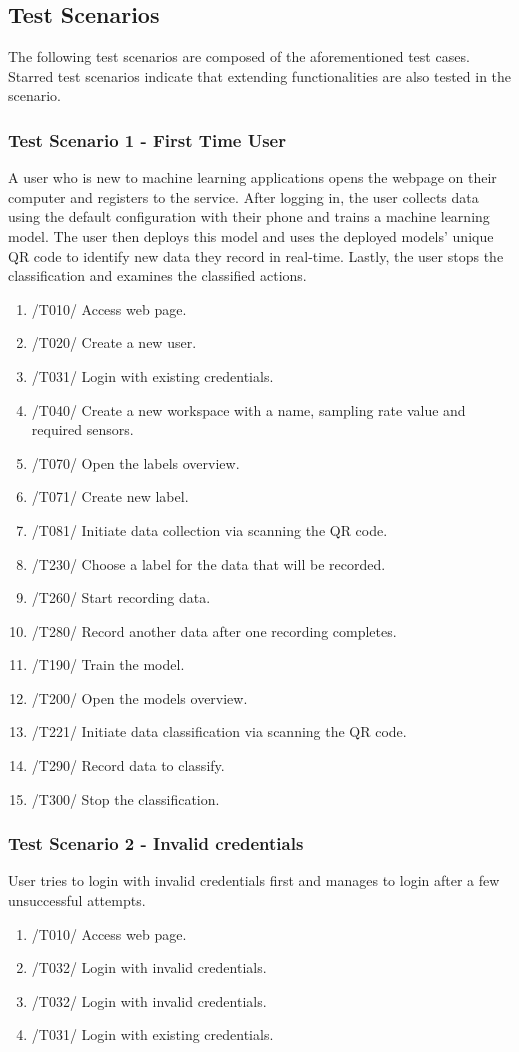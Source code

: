 \subsection{Test Scenarios}
The following test scenarios are composed of the aforementioned test cases. Starred test scenarios indicate that extending functionalities are also tested in the scenario.
\subsubsection{Test Scenario 1 - First Time User}
A user who is new to machine learning applications opens the webpage on their computer and registers to the service. After logging in, the user collects data using the default configuration with their phone and trains a machine learning model. The user then deploys this model and uses the deployed models' unique QR code to identify new data they record in real-time. Lastly, the user stops the classification and examines the classified actions.
\begin{enumerate}
    \item /T010/ Access web page.
    \item /T020/ Create a new user.
    \item /T031/ Login with existing credentials.
    \item /T040/ Create a new workspace with a name, sampling rate value and required sensors.
    \item /T070/ Open the labels overview.
    \item /T071/ Create new label.
    \item /T081/ Initiate data collection via scanning the QR code.
    \item /T230/ Choose a label for the data that will be recorded.
    \item /T260/ Start recording data.
    \item /T280/ Record another data after one recording completes.
    \item /T190/ Train the model.
    \item /T200/ Open the models overview.
    \item /T221/ Initiate data classification via scanning the QR code.
    \item /T290/ Record data to classify.
    \item /T300/ Stop the classification.
\end{enumerate}
\subsubsection{Test Scenario 2 - Invalid credentials}
User tries to login with invalid credentials first and manages to login after a few unsuccessful attempts.
\begin{enumerate}
    \item /T010/ Access web page.
    \item /T032/ Login with invalid credentials.
    \item /T032/ Login with invalid credentials.
    \item /T031/ Login with existing credentials.
\end{enumerate}

